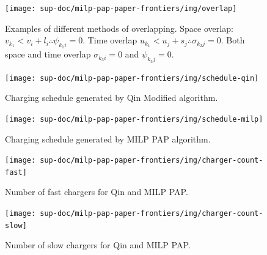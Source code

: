 \documentclass[ee,thesis]{usuthesis}
\begin{document}
\begin{figure}[htpb]
\centering
    \texttt{[image: sup-doc/milp-pap-paper-frontiers/img/overlap]}
    \caption{Examples of different methods of overlapping. Space overlap: $v_{k_1} < v_{i} + l_i \therefore \psi_{k_{1}i} = 0$.
             Time overlap $u_{k_1} < u_{j} + s_j \therefore \sigma_{k_{2}j} = 0$. Both space and time overlap $\sigma_{k_{3}i} = 0$ and
             $\psi_{k_{3}j} = 0$.}
    \label{fig:multipleassign}
\end{figure}

\begin{subfigures}
    \begin{figure}[htpb]
    \centering
    \texttt{[image: sup-doc/milp-pap-paper-frontiers/img/schedule-qin]}
        \caption{Charging schedule generated by Qin Modified algorithm.}
        \label{subfig:qin-schedule}
    \end{figure}

    \hfill

    \begin{figure}[htpb]
    \centering
        \texttt{[image: sup-doc/milp-pap-paper-frontiers/img/schedule-milp]}
        \caption{Charging schedule generated by MILP PAP algorithm.}
        \label{subfig:milp-schedule}
    \end{figure}
\end{subfigures}

\begin{subfigures}
    \begin{figure}[htpb]
    \centering
        \texttt{[image: sup-doc/milp-pap-paper-frontiers/img/charger-count-fast]}
        \caption{Number of fast chargers for Qin and MILP PAP.}
        \label{subfig:fast-charger-usage}
    \end{figure}

    \hfill

    \begin{figure}[!ht]
    \centering
        \texttt{[image: sup-doc/milp-pap-paper-frontiers/img/charger-count-slow]}
        \caption{Number of slow chargers for Qin and MILP PAP.}
        \label{subfig:slow-charger-usage}
    \end{figure}
\end{subfigures}
\end{document}
